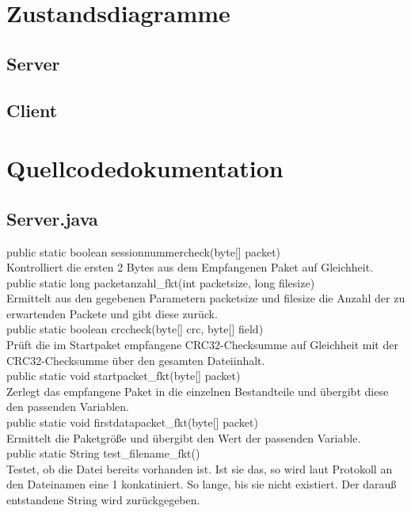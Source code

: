 \documentclass[12pt]{article}
\begin{document}
\section{Zustandsdiagramme}
\subsection{Server}
\subsection{Client}

\section{Quellcodedokumentation}
\subsection{Server.java}
public static boolean sessionnummercheck(byte[] packet)\\
Kontrolliert die ersten 2 Bytes aus dem Empfangenen Paket auf Gleichheit.\\

public static long packetanzahl\_fkt(int packetsize, long filesize)\\
Ermittelt aus den gegebenen Parametern packetsize und filesize die Anzahl der zu erwartenden Packete und gibt diese zurück.\\

public static boolean crccheck(byte[] crc, byte[] field)\\
Prüft die im Startpaket empfangene CRC32-Checksumme auf Gleichheit mit der CRC32-Checksumme über den gesamten Dateiinhalt.\\

public static void startpacket\_fkt(byte[] packet)\\
Zerlegt das empfangene Paket in die einzelnen Bestandteile und übergibt diese den passenden Variablen.\\

public static void firstdatapacket\_fkt(byte[] packet)\\
Ermittelt die Paketgröße und übergibt den Wert der passenden Variable.\\

public static String test\_filename\_fkt()\\
Testet, ob die Datei bereits vorhanden ist. Ist sie das, so wird laut Protokoll an den Dateinamen eine 1 konkatiniert. So lange, bis sie nicht existiert. Der darauß entstandene String wird zurückgegeben.\\
\end{document}

